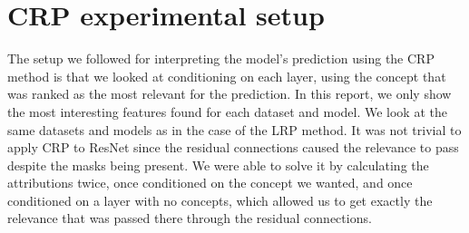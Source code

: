 \documentclass[twoside,11pt]{article}
\begin{document}
\section{CRP experimental setup} \label{appendix:crp_setup}
The setup we followed for interpreting the model's prediction using the CRP method is that we looked at conditioning on each layer, using the concept that was ranked as the most relevant for the prediction. In this report, we only show the most interesting features found for each dataset and model. We look at the same datasets and models as in the case of the LRP method. It was not trivial to apply CRP to ResNet since the residual connections caused the relevance to pass despite the masks being present. We were able to solve it by calculating the attributions twice, once conditioned on the concept we wanted, and once conditioned on a layer with no concepts, which allowed us to get exactly the relevance that was passed there through the residual connections.
\end{document}

